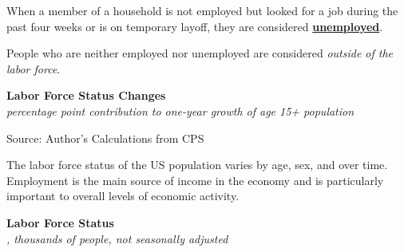 \documentclass{report}
\makeatletter
\newcommand{\tbllink}[1]{\href{https://raw.githubusercontent.com/bdecon/US-chartbook/master/chartbook/data/#1}{\faTable}}
\newcommand*\short[1]{\expandafter\@gobbletwo\number\numexpr#1\relax}
\newcommand{\ctsbar}[5]{
		\addplot[ybar stacked, bar width=#5, draw opacity=0, fill=#1] 
			table [x=#2, y=#3, col sep=comma]{#4};}
\newcommand{\dateaxisticks}{
		date coordinates in=x, axis line style={draw=none},
		xmax={2024-01-31},
		max space between ticks=40,	    
		xtick={{1990-01-01}, {1992-01-01}, {1994-01-01}, 
			{1996-01-01}, {1998-01-01}, {2000-01-01}, 
			{2002-01-01}, {2004-01-01}, {2006-01-01},
			{2008-01-01}, {2010-01-01}, {2012-01-01}, {2014-01-01},
		    {2016-01-01}, {2018-01-01}, {2020-01-01}, {2022-01-01}, 
		    {2024-01-01}, {2026-01-01}},
		minor xtick={{1989-01-01}, {1991-01-01}, {1993-01-01},
			{1995-01-01}, {1997-01-01}, {1999-01-01}, 
			{2001-01-01}, {2003-01-01}, {2005-01-01}, {2007-01-01},
		    {2009-01-01}, {2011-01-01}, {2013-01-01}, {2015-01-01},
		    {2017-01-01}, {2019-01-01}, {2021-01-01}, {2023-01-01}, 
		    {2025-01-01}, {2027-01-01}},
		enlarge y limits={0.06}, enlarge x limits={0.01},
		xticklabel style={align=center, yshift=-2pt}, tick label style={inner sep=0pt},
		}
\newcommand{\bbar}[2]{extra #1 ticks = {{#2}}, extra #1 tick labels = ,
		extra #1 tick style = {grid=major, grid style={thick, black!25}},}
\newcommand{\rbars}{
		\fill[color=black!10] (axis cs:{1990-07-01},\pgfkeysvalueof{/pgfplots/ymin})
			rectangle (axis cs:{1991-03-01}, \pgfkeysvalueof{/pgfplots/ymax});
		\fill[color=black!10] (axis cs:{2007-12-01},\pgfkeysvalueof{/pgfplots/ymin})
			rectangle (axis cs:{2009-07-01}, \pgfkeysvalueof{/pgfplots/ymax});
		\fill[color=black!10] (axis cs:{2001-03-01},\pgfkeysvalueof{/pgfplots/ymin})
			rectangle (axis cs:{2001-11-01}, \pgfkeysvalueof{/pgfplots/ymax});
		\fill[color=black!10] (axis cs:{2020-02-01},\pgfkeysvalueof{/pgfplots/ymin})
			rectangle (axis cs:{2020-05-01}, \pgfkeysvalueof{/pgfplots/ymax});}
\makeatother
\begin{document}
{\begin{minipage}{1.0\textwidth}
\small When a member of a household is not employed but looked for a job during the past four weeks or is on temporary layoff, they are considered \href{https://www.bls.gov/cps/cps_htgm.htm}{\textbf{unemployed}}. 

People who are neither employed nor unemployed are considered \textit{outside of the labor force}.  
\vspace{1mm}

\normalsize \textbf{Labor Force Status Changes}\\
\footnotesize{\textit{percentage point contribution to one-year growth of age 15+ population}}
\vspace{5.4cm}

\hspace{2mm} 

\footnotesize{Source: Author's Calculations from CPS} \hfill \tbllink{cps_lfs2.csv}
\end{minipage}
\newpage
{}
\begin{minipage}{1.0\textwidth} 
\small The labor force status of the US population varies by age, sex, and over time. Employment is the main source of income in the economy and is particularly important to overall levels of economic activity. 
\vspace{1mm}

\normalsize \textbf{Labor Force Status}\\
\footnotesize{\textit{\unskip, thousands of people, not seasonally adjusted}}\\
\noindent {} \setlength{\tabcolsep}{3.0pt} \color{black!90}
		{\renewcommand{\arraystretch}{1.5}
\hspace*{-1mm} \begin{tabular}{p{28.5mm} R{11.2mm} R{10.4mm} R{10.4mm} R{10.2mm} 
		 				 R{10.6mm} R{10.4mm} R{10.4mm}}
			  \hline
		\end{tabular}}
\vspace{-3mm}	
	

\end{minipage}}
\end{document}
